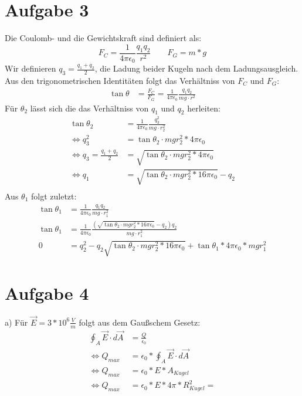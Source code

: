 \documentclass[a4paper]{article}
\newcommand{\kco}{\frac{1}{4\pi\epsilon_0}}
\begin{document}
\newpage
\setlength{\headheight}{0cm}
\section*{Aufgabe 3}
Die Coulomb- und die Gewichtskraft sind definiert als:
\[
	F_C = \kco \frac{q_1q_2}{r^2} \qquad F_G = m*g
\]
Wir definieren $q_3 = \frac{q_1 + q_2}{2} $, die Ladung  beider Kugeln nach dem Ladungsausgleich. Aus den trigonometrischen Identitäten folgt das Verhältniss von $F_C$ und $F_G$:
\begin{align*}
	\tan \theta &= \frac{F_C}{F_G} =  \kco \frac{q_1q_2}{mg \cdot r^2}
\end{align*}
Für $\theta_2$ lässt sich die das Verhältniss von $q_1$ und $q_2$ herleiten:
\begin{align*}
	\tan \theta_2 &= \kco \frac{q_3^2}{mg \cdot r_2^2} \\
	\Leftrightarrow
	q_3^2 &= \tan \theta_2 \cdot mg r_2^2 * 4\pi\epsilon_0 \\
	\Leftrightarrow
	q_3 = \frac{q_1 + q_2}{2} &= \sqrt{\tan \theta_2 \cdot mg r_2^2 * 4\pi\epsilon_0} \\
	\Leftrightarrow
	q_1 &= \sqrt{\tan \theta_2 \cdot mg r_2^2 * 16\pi\epsilon_0} - q_2 \\
\end{align*}
Aus $\theta_1$ folgt zuletzt:
\begin{align*}
	\tan \theta_1 &= \kco \frac{q_1q_2}{mg \cdot r_1^2} \\
	\tan \theta_1 &= \kco \frac{ \left( \sqrt{\tan \theta_2 \cdot mg r_2^2 * 16\pi\epsilon_0} - q_2 \right) q_2}{mg \cdot r_1^2} \\
	0 &= q_2^2 - q_2 \sqrt{\tan \theta_2 \cdot mg r_2^2 * 16\pi\epsilon_0}  + \tan \theta_1 * 4\pi\epsilon_0	*mg r_1^2 
\end{align*}


\section*{Aufgabe 4}
\par{a)}
Für $\vec E = 3 * 10^6 \frac V m$ folgt aus dem Gaußschem Gesetz:
\begin{align*}
	\oint_A \vec E \cdot d\vec{A} &= \frac Q {\epsilon_0} \\
	\Leftrightarrow
	Q_{max}	&= \epsilon_0 * \oint_A \vec E \cdot d\vec{A}\\
	\Leftrightarrow
	Q_{max}	&= \epsilon_0 * E * A_{Kugel}\\
	\Leftrightarrow
	Q_{max}	&= \epsilon_0 * E * 4\pi*R_{Kugel}^2 = 
\end{align*}
\vspace{0.5cm}
\end{document}
